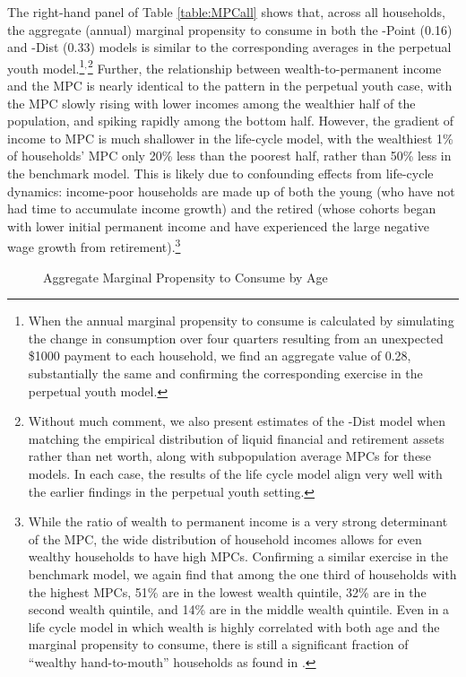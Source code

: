 \documentclass[12pt,titlepage]{econtex}
\begin{document}
The right-hand panel of Table \ref{table:MPCall} shows that, across all households, the aggregate (annual) marginal propensity to consume in both the \Discount-Point (0.16) and \Discount-Dist (0.33) models is similar to the corresponding averages in the perpetual youth model.\footnote{When the annual marginal propensity to consume is calculated by simulating the change in consumption over four quarters resulting from an unexpected \$1000 payment to each household, we find an aggregate value of 0.28, substantially the same and confirming the corresponding exercise in the perpetual youth model.}$^{,}$\footnote{Without much comment, we also present estimates of the \Discount-Dist model when matching the empirical distribution of liquid financial and retirement assets rather than net worth, along with subpopulation average MPCs for these models.  In each case, the results of the life cycle model align very well with the earlier findings in the perpetual youth setting.}  Further, the relationship between wealth-to-permanent income and the MPC is nearly identical to the pattern in the perpetual youth case, with the MPC slowly rising with lower incomes among the wealthier half of the population, and spiking rapidly among the bottom half.  However, the gradient of income to MPC is much shallower in the life-cycle model, with the wealthiest 1\% of households' MPC only 20\% less than the poorest half, rather than 50\% less in the benchmark model.  This is likely due to confounding effects from life-cycle dynamics: income-poor households are made up of both the young (who have not had time to accumulate income growth) and the retired (whose cohorts began with lower initial permanent income and have experienced the large negative wage growth from retirement).\footnote{%
While the ratio of wealth to permanent income is a very strong determinant of the MPC, the wide distribution of household incomes allows for even wealthy households to have high MPCs.  Confirming a similar exercise in the benchmark model, we again find that among the one third of households with the highest MPCs, 51\% are in the lowest wealth quintile, 32\% are in the second wealth quintile, and 14\% are in the middle wealth quintile.  Even in a life cycle model in which wealth is highly correlated with both age and the marginal propensity to consume, there is still a significant fraction of ``wealthy hand-to-mouth'' households as found in \cite{kaplanViolanteWeidner_wealthyH2M}.}

\begin{figure}
\caption{Aggregate Marginal Propensity to Consume by Age}
\label{fig:MPCbyAge}
\begin{center}
\end{center}
\end{figure}
\end{document}

